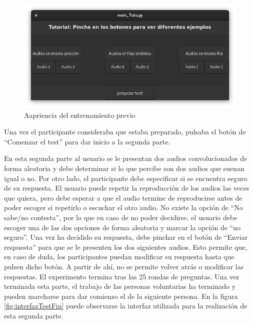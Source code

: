 \documentclass[11pt,a4paper,twoside]{book}
\begin{document}
                \begin{figure}
                    \includegraphics[scale=0.6]{../imagenes/interfaz_tutorial.png}
			        \centering
			        \caption{Aapriencia del entrenamiento previo}
			        \label{fig:interfazTutorial}
                \end{figure}
                
                Una vez el participante consideraba que estaba preparado, pulsaba el botón de ``Comenzar el test'' para dar inicio a la segunda parte.
                
                En esta segunda parte al usuario se le presentan dos audios convolucionados de forma aleatoria y debe determinar si lo que percibe son dos audios que suenan igual o no. Por otro lado, el participante debe especificar si se encuentra seguro de su respuesta. El usuario puede repetir la reproducción de los audios las veces que quiera, pero debe esperar a que el audio termine de reproducirse antes de poder escoger si repetirlo o escuchar el otro audio. No existe la opción de ``No sabe/no contesta'', por lo que en caso de no poder decidirse, el usuario debe escoger una de las dos opciones de forma aleatoria y marcar la opción de ``no seguro''. Una vez ha decidido su respuesta, debe pinchar en el botón de ``Enviar respuesta'' para que se le presenten los dos siguientes audios. Esto permite que, en caso de duda, los participantes puedan modificar su respuesta hasta que pulsen dicho botón. A partir de ahí, no se permite volver atrás o modificar las respuestas. El experimento termina tras las 25 rondas de preguntas. Una vez terminada esta parte, el trabajo de las personas voluntarias ha terminado y pueden marcharse para dar comienzo el de la siguiente persona. En la figura \ref{fig:interfazTestFin} puede observarse la interfaz utilizada para la realización de esta segunda parte.
                
\end{document}
